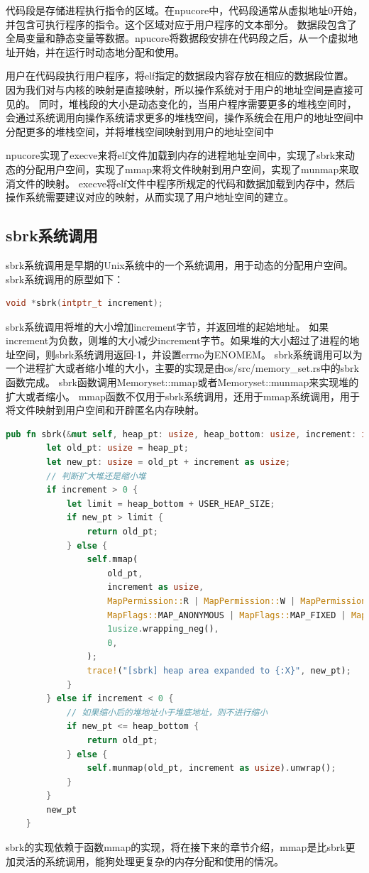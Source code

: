 代码段是存储进程执行指令的区域。在npucore中，代码段通常从虚拟地址0开始，并包含可执行程序的指令。这个区域对应于用户程序的文本部分。
数据段包含了全局变量和静态变量等数据。npucore将数据段安排在代码段之后，从一个虚拟地址开始，并在运行时动态地分配和使用。

用户在代码段执行用户程序，将elf指定的数据段内容存放在相应的数据段位置。因为我们对与内核的映射是直接映射，所以操作系统对于用户的地址空间是直接可见的。
同时，堆栈段的大小是动态变化的，当用户程序需要更多的堆栈空间时，会通过系统调用向操作系统请求更多的堆栈空间，操作系统会在用户的地址空间中分配更多的堆栈空间，并将堆栈空间映射到用户的地址空间中

npucore实现了execve来将elf文件加载到内存的进程地址空间中，实现了sbrk来动态的分配用户空间，实现了mmap来将文件映射到用户空间，实现了munmap来取消文件的映射。
execve将elf文件中程序所规定的代码和数据加载到内存中，然后操作系统需要建议对应的映射，从而实现了用户地址空间的建立。


\subsection{sbrk系统调用}
sbrk系统调用是早期的Unix系统中的一个系统调用，用于动态的分配用户空间。sbrk系统调用的原型如下：
\begin{lstlisting}[language=c]
    void *sbrk(intptr_t increment);
\end{lstlisting}
sbrk系统调用将堆的大小增加increment字节，并返回堆的起始地址。
如果increment为负数，则堆的大小减少increment字节。如果堆的大小超过了进程的地址空间，则sbrk系统调用返回-1，并设置errno为ENOMEM。
sbrk系统调用可以为一个进程扩大或者缩小堆的大小，主要的实现是由os/src/memory_set.rs中的sbrk函数完成。
sbrk函数调用Memoryset::mmap或者Memoryset::munmap来实现堆的扩大或者缩小。
mmap函数不仅用于sbrk系统调用，还用于mmap系统调用，用于将文件映射到用户空间和开辟匿名内存映射。
\begin{lstlisting}[language=rust,caption={sbrk}]
    pub fn sbrk(&mut self, heap_pt: usize, heap_bottom: usize, increment: isize) -> usize {
        let old_pt: usize = heap_pt;
        let new_pt: usize = old_pt + increment as usize;
        // 判断扩大堆还是缩小堆
        if increment > 0 {
            let limit = heap_bottom + USER_HEAP_SIZE;
            if new_pt > limit {
                return old_pt;
            } else {
                self.mmap(
                    old_pt,
                    increment as usize,
                    MapPermission::R | MapPermission::W | MapPermission::U,
                    MapFlags::MAP_ANONYMOUS | MapFlags::MAP_FIXED | MapFlags::MAP_PRIVATE,
                    1usize.wrapping_neg(),
                    0,
                );
                trace!("[sbrk] heap area expanded to {:X}", new_pt);
            }
        } else if increment < 0 {
            // 如果缩小后的堆地址小于堆底地址，则不进行缩小
            if new_pt <= heap_bottom {
                return old_pt;
            } else {
                self.munmap(old_pt, increment as usize).unwrap();
            }
        }
        new_pt
    }
\end{lstlisting}
sbrk的实现依赖于函数mmap的实现，将在接下来的章节介绍，mmap是比sbrk更加灵活的系统调用，能狗处理更复杂的内存分配和使用的情况。



